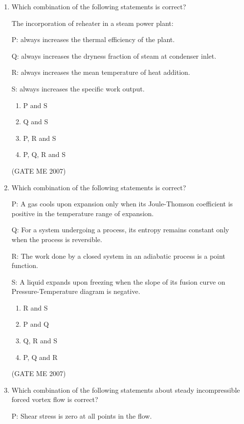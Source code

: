 \documentclass[journal]{IEEEtran}
\begin{document}
\begin{enumerate}
\item Which combination of the following statements is correct?

The incorporation of reheater in a steam power plant:

P: always increases the thermal efficiency of the plant.

Q: always increases the dryness fraction of steam at condenser inlet.

R: always increases the mean temperature of heat addition. 

S: always increases the specific work output.

\begin{multicols}{4}
\begin{enumerate}
\item P and S
\item Q and S
\item P, R and S
\item P, Q, R and S
\end{enumerate}
\end{multicols}
\hfill (GATE ME 2007)

\item Which combination of the following statements is correct? 

P: A gas cools upon expansion only when its Joule-Thomson coefficient is positive in the temperature range of expansion.

Q: For a system undergoing a process, its entropy remains constant only when the process is reversible.  

R: The work done by a closed system in an adiabatic process is a point function.  

S: A liquid expands upon freezing when the slope of its fusion curve on Pressure-Temperature diagram is negative.

\begin{multicols}{4}
\begin{enumerate}
\item R and S
\item P and Q
\item Q, R and S
\item P, Q and R
\end{enumerate}
\end{multicols}
\hfill (GATE ME 2007)

\item Which combination of the following statements about steady incompressible forced vortex flow is correct?

P: Shear stress is zero at all points in the flow.


\end{enumerate}
\end{document}

